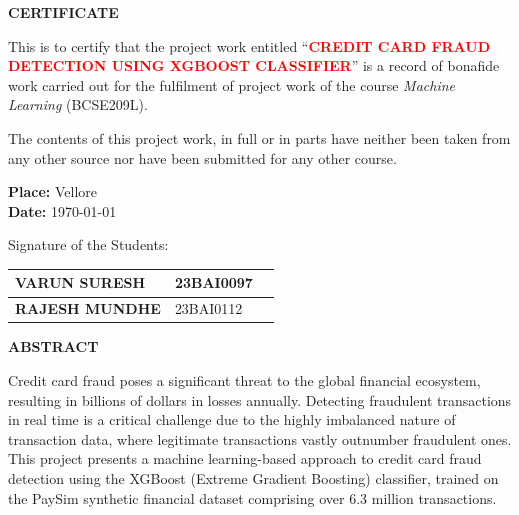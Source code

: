 \documentclass[12pt,a4paper]{report}
\begin{document}
\begin{center}
{\Large \textbf{CERTIFICATE}}
\end{center}

\vspace{1cm}

\noindent This is to certify that the project work entitled ``\textbf{\textcolor{red}{CREDIT CARD FRAUD DETECTION USING XGBOOST CLASSIFIER}}'' is a record of bonafide work carried out for the fulfilment of project work of the course \textit{Machine Learning} (BCSE209L).

\vspace{0.5cm}

\noindent The contents of this project work, in full or in parts have neither been taken from any other source nor have been submitted for any other course.

\vspace{1.5cm}

\noindent \textbf{Place:} Vellore\\
\textbf{Date:} \today

\vspace{1.5cm}

\noindent Signature of the Students:

\vspace{0.5cm}

\begin{center}
\begin{tabular}{|p{5cm}|p{4cm}|p{4cm}|}
\hline
\textbf{VARUN SURESH } & 23BAI0097 & \\
\hline
\textbf{RAJESH MUNDHE } & 23BAI0112 & \\

\hline
\end{tabular}
\end{center}

\clearpage
\tableofcontents

\clearpage
\begin{center}
{\Large \textbf{ABSTRACT}}
\end{center}

\vspace{0.8cm}
Credit card fraud poses a significant threat to the global financial ecosystem, resulting in billions of dollars in losses annually. Detecting fraudulent transactions in real time is a critical challenge due to the highly imbalanced nature of transaction data, where legitimate transactions vastly outnumber fraudulent ones. This project presents a machine learning-based approach to credit card fraud detection using the XGBoost (Extreme Gradient Boosting) classifier, trained on the PaySim synthetic financial dataset comprising over 6.3 million transactions.
\end{document}
